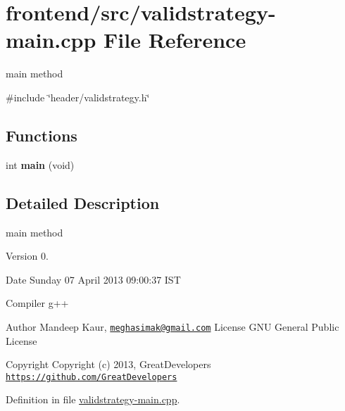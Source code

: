 \hypertarget{validstrategy-main_8cpp}{\section{frontend/src/validstrategy-\/main.cpp \-File \-Reference}
\label{validstrategy-main_8cpp}
}


main method  


{\ttfamily \#include \char`\"{}header/validstrategy.\-h\char`\"{}}\*
\subsection*{\-Functions}
\begin{DoxyCompactItemize}
\item 
\hypertarget{validstrategy-main_8cpp_a840291bc02cba5474a4cb46a9b9566fe}{int {\bfseries main} (void)}\label{validstrategy-main_8cpp_a840291bc02cba5474a4cb46a9b9566fe}

\end{DoxyCompactItemize}


\subsection{\-Detailed \-Description}
main method \begin{DoxyVersion}{\-Version}
0. 
\end{DoxyVersion}
\begin{DoxyDate}{\-Date}
\-Sunday 07 \-April 2013 09\-:00\-:37 \-I\-S\-T\par
 \-Compiler g++
\end{DoxyDate}
\begin{DoxyAuthor}{\-Author}
\-Mandeep \-Kaur, \href{mailto:meghasimak@gmail.com}{\tt meghasimak@gmail.\-com} \-License \-G\-N\-U \-General \-Public \-License 
\end{DoxyAuthor}
\begin{DoxyCopyright}{\-Copyright}
\-Copyright (c) 2013, \-Great\-Developers \href{https://github.com/GreatDevelopers}{\tt https\-://github.\-com/\-Great\-Developers} 
\end{DoxyCopyright}


\-Definition in file \hyperlink{validstrategy-main_8cpp_source}{validstrategy-\/main.\-cpp}.

